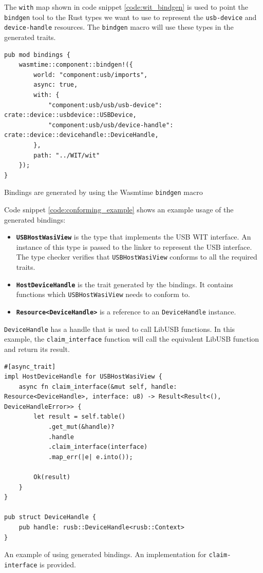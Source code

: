 The \texttt{with} map shown in code snippet \ref{code:wit_bindgen} is used to point the \texttt{bindgen} tool to the Rust types we want to use to represent the \texttt{usb-device} and \texttt{device-handle} resources. The \texttt{bindgen} macro will use these types in the generated traits.

\begin{code}
\begin{verbatim}
pub mod bindings {
	wasmtime::component::bindgen!({
		world: "component:usb/imports",
		async: true,
		with: {
			"component:usb/usb/usb-device": crate::device::usbdevice::USBDevice,
			"component:usb/usb/device-handle": crate::device::devicehandle::DeviceHandle,
		},
		path: "../WIT/wit"
	});
}
\end{verbatim} 
\caption{Bindings are generated by using the Wasmtime \texttt{bindgen} macro}
\label{code:wit_bindgen}
\end{code}

Code snippet \ref{code:conforming_example} shows an example usage of the generated bindings:
\begin{itemize}
\item \textbf{\texttt{USBHostWasiView}} is the type that implements the \acrshort{USB} \acrshort{WIT} interface. An instance of this type is passed to the linker to represent the \acrshort{USB} interface. The type checker verifies that \texttt{USBHostWasiView} conforms to all the required traits.
\item \textbf{\texttt{HostDeviceHandle}} is the trait generated by the bindings. It contains functions which \texttt{USBHostWasiView} needs to conform to.
\item \textbf{\texttt{Resource<DeviceHandle>}} is a reference to an \texttt{DeviceHandle} instance. 
\end{itemize}

\texttt{DeviceHandle} has a handle that is used to call LibUSB functions. In this example, the \texttt{claim\_interface} function will call the equivalent LibUSB function and return its result.\\

\begin{code}
\begin{verbatim}
#[async_trait]
impl HostDeviceHandle for USBHostWasiView {
	async fn claim_interface(&mut self, handle: Resource<DeviceHandle>, interface: u8) -> Result<Result<(), DeviceHandleError>> {
		let result = self.table()
			.get_mut(&handle)?
			.handle
			.claim_interface(interface)
			.map_err(|e| e.into());
	
		Ok(result)
	}
}

pub struct DeviceHandle {
	pub handle: rusb::DeviceHandle<rusb::Context>
}
\end{verbatim} 
\caption{An example of using generated bindings. An implementation for \texttt{claim-interface} is provided.}
\label{code:conforming_example}
\end{code}

